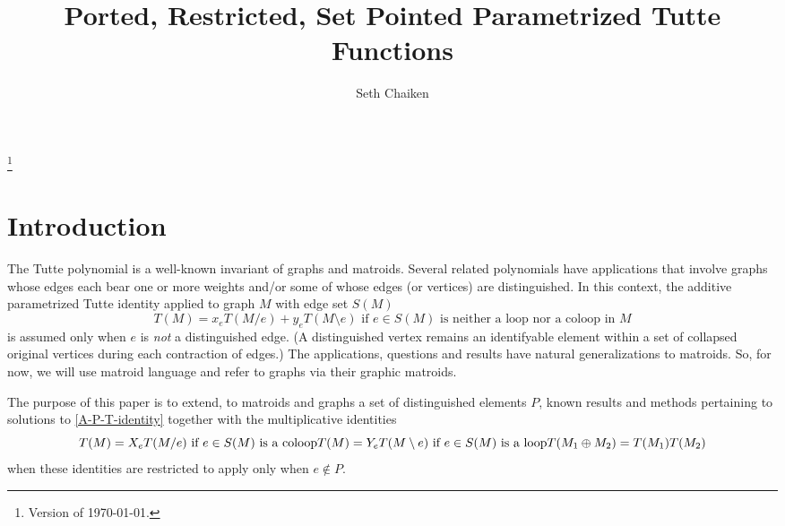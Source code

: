 \documentclass[12pt,leqno]{amsart}
\theoremstyle{remark}
\begin{document}
\title{Ported, Restricted, Set Pointed Parametrized Tutte Functions}

\author{Seth Chaiken}
\address{Computer Science Department\\
The University at Albany (SUNY)\\
Albany, NY 12222, U.S.A.}



\begin{abstract}
 \end{abstract}





\thanks{Version of \today.}

\maketitle
\pagestyle{headings}


\section*{Introduction}

The Tutte polynomial is a well-known invariant of graphs and matroids.  Several
related polynomials have applications that involve graphs whose edges each bear
one or more weights and/or some of whose edges (or vertices) are distinguished.
In this context, the additive parametrized Tutte identity applied to graph $M$
with edge set $S(M)$
\begin{equation}
\label{A-P-T-identity}
T(M) = x_e T(M/e) + y_e T(M\setminus e) \text{ if $e\in S(M)$ is neither a loop nor a coloop in $M$}
\end{equation}
is assumed only when $e$ is \emph{not} a distinguished edge.  (A distinguished vertex
remains an identifyable element within a set of collapsed original vertices
during each contraction of edges.)  The applications, questions
and results have natural generalizations to matroids.  So, for now, we will
use matroid language and refer to graphs via their graphic matroids.

The purpose of this paper is to extend, to matroids and graphs
a set of distinguished elements $P$,  known results and methods pertaining
to solutions to \ref{A-P-T-identity} together with the multiplicative
identities
\begin{equation}
\label{M-P-T-identities}
T(M)=X_e T(M/e) \text{ if $e\in S(M)$ is a coloop}\\
T(M)=Y_e T(M\setminus e) \text{ if $e\in S(M)$ is a loop}\\
T(M_1\oplus M_2)=T(M_1)T(M_2)
\end{equation}
when these identities are restricted to apply only when
$e\not\in P$.  
\end{document}
